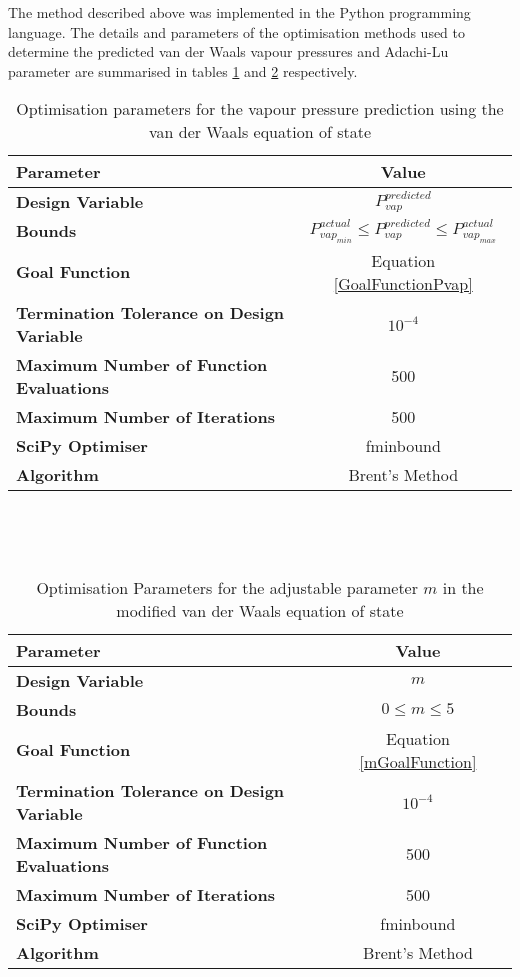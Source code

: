 The method described above was implemented in the Python programming language. The details and parameters of the optimisation methods used to determine the predicted van der Waals vapour pressures and Adachi-Lu parameter are summarised in tables \ref{PvapOptParam} and \ref{mOptParam} respectively.\\

\begin{table}
\begin{tabularx}{\textwidth}{l|c}
\hline
\textbf{Parameter}&\textbf{Value}\\
\hline
\hline
\textbf{Design Variable}& $P_{vap}^{predicted}$\\
\textbf{Bounds}& $P_{vap_{min}}^{actual} \leq P_{vap}^{predicted} \leq P_{vap_{max}}^{actual}$\\
\textbf{Goal Function}& Equation \ref{GoalFunctionPvap} \\
\textbf{Termination Tolerance on Design Variable}& $10^{-4}$\\
\textbf{Maximum Number of Function Evaluations}&500\\
\textbf{Maximum Number of Iterations}&500\\				
\textbf{SciPy Optimiser }&fminbound\\
\textbf{Algorithm}& Brent's Method\\
\hline
\end{tabularx}\\
\caption{Optimisation parameters for the vapour pressure prediction using the van der Waals equation of state } \label{PvapOptParam}
\end{table}\

\begin{table}
\begin{tabularx}{\textwidth}{l|c}
\hline
\textbf{Parameter}&\textbf{Value}\\
\hline
\hline
\textbf{Design Variable}& $m$\\
\textbf{Bounds}&$ 0 \leq m \leq 5$\\
\textbf{Goal Function}&Equation \ref{mGoalFunction} \\
\textbf{Termination Tolerance on Design Variable}&$10^{-4}$\\
\textbf{Maximum Number of Function Evaluations}&500\\
\textbf{Maximum Number of Iterations}&500\\				
\textbf{SciPy Optimiser }&fminbound\\
\textbf{Algorithm}& Brent's Method\\
\hline
\end{tabularx}\\
\caption{Optimisation Parameters for the adjustable parameter $m$ in the modified van der Waals equation of state} \label{mOptParam}			
\end{table}\
					
